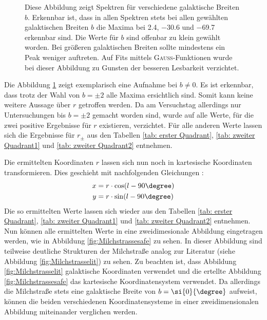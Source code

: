 \begin{figure}[H]
    \centering
       
    \caption[Spektren für verschiedene galaktische Breiten $b$]{Diese Abbildung zeigt Spektren für verschiedene galaktische Breiten $b$. Erkennbar ist, dass in allen Spektren stets bei allen gewählten galaktischen Breiten $b$ die Maxima bei \SI{2.4}{}, \SI{-30.6}{} und \SI{-69.7}{} erkennbar sind. Die Werte für $b$ sind offenbar zu klein gewählt worden. Bei größeren galaktischen Breiten sollte mindestens ein Peak weniger auftreten. Auf Fits mittels \textsc{Gauß}-Funktionen wurde bei dieser Abbildung zu Gunsten der besseren Lesbarkeit verzichtet.}
    \label{fig:bungleichnull}
\end{figure}

Die Abbildung \ref{fig:bungleichnull} zeigt exemplarisch eine Aufnahme bei $b \neq 0$. Es ist erkennbar, dass trotz der Wahl von $b = \pm 2$ alle Maxima ersichtlich sind. Somit kann keine weitere Aussage über $r$ getroffen werden. Da am Versuchstag allerdings nur Untersuchungen bis $b = \pm 2$ gemacht worden sind, wurde auf alle Werte, für die zwei positive Ergebnisse für $r$ existieren, verzichtet. Für alle anderen Werte lassen sich die Ergebnisse für $r_{\pm}$ aus den Tabellen \ref{tab: erster Quadrant}, \ref{tab: zweiter Quadrant1} und \ref{tab: zweiter Quadrant2} entnehmen.

Die ermittelten Koordinaten $r$ lassen sich nun noch in kartesische Koordinaten transformieren. Dies geschieht mit nachfolgenden Gleichungen \cite{H1}:
\begin{align}
    x &= r \cdot \cos(l-90\degree) \\
    y &= r \cdot \sin(l-90\degree) 
    \label{eq:umrechnung}
\end{align}
Die so ermittelten Werte lassen sich wieder aus den Tabellen \ref{tab: erster Quadrant}, \ref{tab: zweiter Quadrant1} und \ref{tab: zweiter Quadrant2} entnehmen.\newline
Nun können alle ermittelten Werte in eine zweidimesionale Abbildung eingetragen werden, wie in Abbildung \ref{fig:Milchstrassesafe} zu sehen. In dieser Abbildung sind teilweise deutliche Strukturen der Milchstraße analog zur Literatur (siehe Abbildung \ref{fig:Milchstrasselit}) zu sehen.
Zu beachten ist, dass Abbildung \ref{fig:Milchstrasselit} galaktische Koordinaten verwendet und die ertellte Abbildung \ref{fig:Milchstrassesafe} das kartesische Koordinatensystem verwendet.
Da allerdings die Milchstraße stets eine galaktische Breite von $b= \si{0}{\degree}$ aufweist, können die beiden verschiedenen Koordinatensysteme in einer zweidimensionalen Abbildung miteinander verglichen werden.\newline

